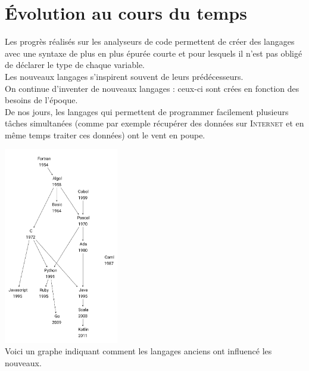 \section{\'Evolution au cours du temps}


Les progrès réalisés sur les analyseurs de code permettent de créer des langages avec une syntaxe de plus en plus épurée courte et pour lesquels il n'est pas obligé de déclarer le type de chaque variable.\\
Les nouveaux langages s'inspirent souvent de leurs prédécesseurs.\\
    
On continue d'inventer de nouveaux langages : ceux-ci sont crées en fonction des besoins de l'époque.\\
De nos jours, les langages qui permettent de programmer facilement plusieurs tâches simultanées (comme par exemple récupérer des données sur \textsc{Internet} et en même temps traiter ces données) ont le vent en poupe.

\begin{center}
    \includegraphics[width=5cm]{ch-langages/img/genealogie.png}\\ \scriptsize   Voici un graphe indiquant comment les langages anciens ont influencé les nouveaux.\\
\end{center}
\ \\[3em]



